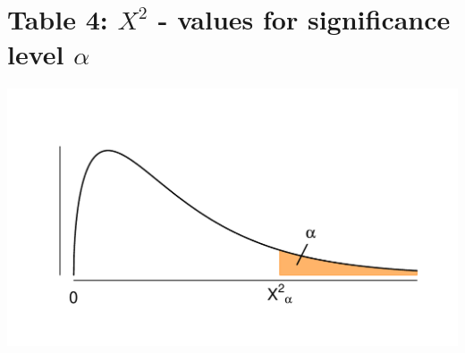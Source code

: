 \section{Table 4: $X^2$ - values for significance level $\alpha$}
\label{table4}

\vspace*{-30pt}
\begin{minipage}{0.6\textwidth}
\hfill
\end{minipage}
\begin{minipage}{0.4\textwidth}
\includegraphics[width=\textwidth]{Files/Images/chisquare.pdf}
\end{minipage}

